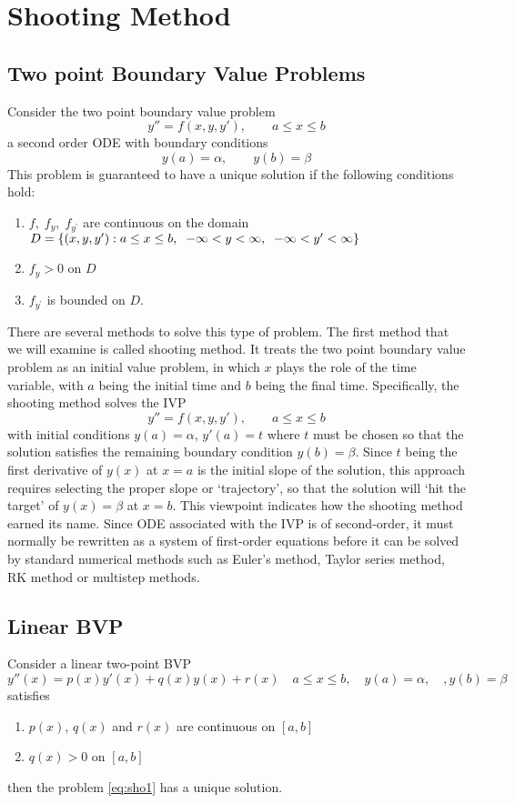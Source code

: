 \documentclass[../main-sheet.tex]{subfiles}
\begin{document}
\chapter{Shooting Method}
\section{Two point Boundary Value Problems}
Consider the two point boundary value problem
\[y''=f(x,y,y'), \qquad a\leq x\leq b\]
a second order ODE with boundary conditions
\[y(a)=\alpha,\qquad y(b)=\beta\]
This problem is guaranteed to have a unique solution if the following conditions hold:
\begin{enumerate}[label=(\roman*)]
    \item \(f,\;f_y,\;f_{y^{'}}\) are continuous on the domain \(D=\left\{(x,y,y'):a\leq x\leq b,\;\;-\infty < y<\infty,\;\;-\infty < y'<\infty\right\}\)
    \item \(f_y>0\) on \(D\)
    \item \(f_{y^{'}}\) is bounded on \(D\).
\end{enumerate}
\begin{note}
    There are several methods to solve this type of problem. The first method that we will examine is called shooting method. It treats the two point boundary value problem as an initial value problem, in which \(x\) plays the role of the time variable, with \(a\) being the initial time and \(b\) being the final time. Specifically, the shooting method solves the IVP
    \[y''=f(x,y,y'), \qquad a\leq x\leq b\]
    with initial conditions \(y(a)=\alpha\), \(y'(a)=t\) where \(t\) must be chosen so that the solution satisfies the remaining boundary condition \(y(b)=\beta\). Since \(t\) being the first derivative of \(y(x)\) at \(x=a\) is the initial slope of the solution, this approach requires selecting the proper slope or `trajectory', so that the solution will `hit the target' of \(y(x)=\beta\) at \(x=b\). This viewpoint indicates how the shooting method earned its name. Since ODE associated with the IVP is of second-order, it must normally be rewritten as a system of first-order equations before it can be solved by standard numerical methods such as Euler's method, Taylor series method, RK method or multistep methods.
\end{note}
\section{Linear BVP}
Consider a linear two-point BVP
\begin{equation}
    y''(x)=p(x)y'(x)+q(x)y(x)+r(x)\quad a\leq x\leq b,\quad y(a)=\alpha,\quad, y(b)=\beta \label{eq:sho1}
\end{equation}
satisfies
\begin{enumerate}[label=(\roman*)]
    \item \(p(x)\), \(q(x)\) and \(r(x)\) are continuous on \([a,b]\)
    \item \(q(x)>0\) on \([a,b]\)
\end{enumerate}
then the problem \eqref{eq:sho1} has a unique solution.
\end{document}

